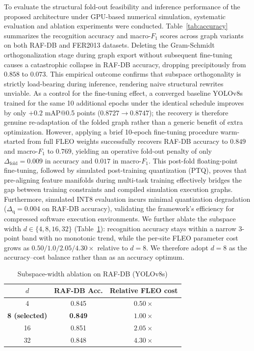 \documentclass[algorithms,article,submit,moreauthors]{Definitions/mdpi}
\newcommand{\rev}[1]{\textcolor{revcolor}{#1}}
\begin{document}
To evaluate the structural fold-out feasibility and inference performance of the proposed architecture under GPU-based numerical simulation, systematic evaluation and ablation experiments were conducted. Table~\ref{tab:accuracy} summarizes the recognition accuracy and macro-$F_1$ scores across graph variants on both RAF-DB and FER2013 datasets. Deleting the Gram-Schmidt orthogonalization stage during graph export without subsequent fine-tuning causes a catastrophic collapse in RAF-DB accuracy, dropping precipitously from $0.858$ to $0.073$. This empirical outcome confirms that subspace orthogonality is strictly load-bearing during inference, rendering naive structural rewrites unviable. \rev{As a control for the fine-tuning effect, a converged baseline YOLOv8s trained for the same 10 additional epochs under the identical schedule improves by only \mbox{$+0.2$} mAP@0.5 points (\mbox{$0.8727 \rightarrow 0.8747$}); the recovery is therefore genuine re-adaptation of the folded graph rather than a generic benefit of extra optimization.} However, applying a brief 10-epoch fine-tuning procedure warm-started from full FLEO weights successfully recovers RAF-DB accuracy to $0.849$ and macro-$F_1$ to $0.769$, yielding an operative fold-out penalty of only $\Delta_{\mathrm{fold}} = 0.009$ in accuracy and $0.017$ in macro-$F_1$. This post-fold floating-point fine-tuning, followed by simulated post-training quantization (PTQ), proves that pre-aligning feature manifolds during multi-task training effectively bridges the gap between training constraints and compiled simulation execution graphs. Furthermore, simulated INT8 evaluation incurs minimal quantization degradation ($\Delta_{\mathrm{q}} = 0.004$ on RAF-DB accuracy), validating the framework's efficiency for compressed software execution environments. \rev{We further ablate the subspace width \mbox{$d \in \{4, 8, 16, 32\}$} (Table~\ref{tab:dablation}): recognition accuracy stays within a narrow \mbox{$3$}-point band with no monotonic trend, while the per-site FLEO parameter cost grows as \mbox{$0.50/1.0/2.05/4.30\times$} relative to \mbox{$d=8$}. We therefore adopt \mbox{$d=8$} as the accuracy--cost balance rather than as an accuracy optimum.}

\begin{table}[h!]
\centering
\caption{\rev{Subspace-width ablation on RAF-DB (YOLOv8s)}}
\label{tab:dablation}
\setlength{\tabcolsep}{8pt}\renewcommand{\arraystretch}{1.2}
\begin{tabular}{ccc}
\toprule
$d$ & RAF-DB Acc. & Relative FLEO cost\\
\midrule
4 & 0.845 & $0.50\times$\\
\textbf{8 (selected)} & \textbf{0.849} & $1.00\times$\\
16 & 0.851 & $2.05\times$\\
32 & 0.848 & $4.30\times$\\
\bottomrule
\end{tabular}
\end{table}
\end{document}
